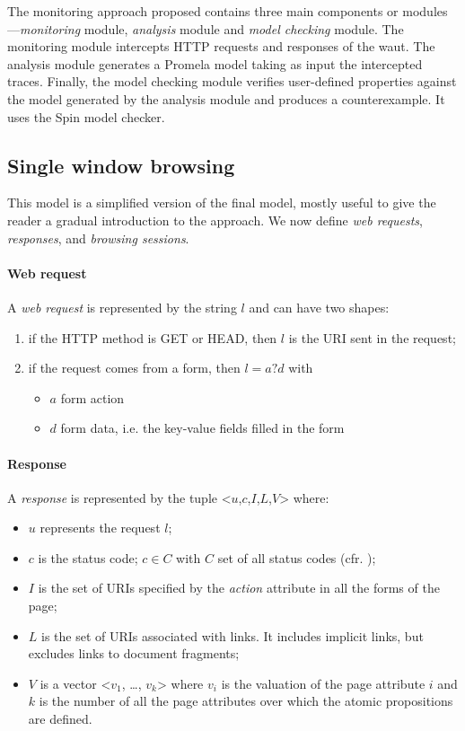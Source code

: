 \documentclass[a4paper,10pt]{article}
\begin{document}
The monitoring approach proposed contains three main components or modules---\textit{monitoring} module, \textit{analysis} module and \textit{model checking} module. The monitoring module intercepts HTTP requests and responses of the \gls{waut}. The analysis module generates a Promela model taking as input the intercepted traces. Finally, the model checking module verifies user-defined properties against the model generated by the analysis module and produces a counterexample. It uses the Spin model checker.

\subsection{Single window browsing}
\label{single-window-browsing}

This model is a simplified version of the final model, mostly useful to give the reader a gradual introduction to the approach. We now define \emph{web requests}, \emph{responses}, and \emph{browsing sessions}.

\paragraph{Web request}
A \emph{web request} is represented by the string $l$ and can have two shapes:

\begin{enumerate}
  \item if the HTTP method is GET or HEAD, then $l$ is the URI sent in the request;
  \item if the request comes from a form, then $l = a?d$ with
    \begin{itemize}
      \item $a$ form action
      \item $d$ form data, i.e. the key-value fields filled in the form
    \end{itemize}
\end{enumerate}

\paragraph{Response}
A \emph{response} is represented by the tuple <$u$,$c$,$I$,$L$,$V$> where:

\begin{itemize}
  \item $u$ represents the request $l$;
  \item $c$ is the status code; $c \in C$ with $C$ set of all status codes (cfr. \cite[\S 15]{Fielding2022});
  \item $I$ is the set of URIs specified by the \textit{action} attribute in all the forms of the page;
  \item $L$ is the set of URIs associated with links. It includes implicit links, but excludes links to document fragments;
  \item $V$ is a vector <$v_1$, \dots, $v_k$> where $v_i$ is the valuation of the page attribute $i$ and $k$ is the number of all the page attributes over which the atomic propositions are defined.
\end{itemize}
\end{document}
